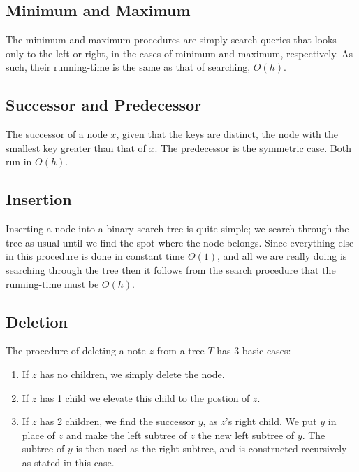 \subsection{Minimum and Maximum}
The minimum and maximum procedures are simply search queries that looks only
to the left or right, in the cases of minimum and maximum, respectively. As
such, their running-time is the same as that of searching, $O(h)$.

\subsection{Successor and Predecessor}
The successor of a node $x$, given that the keys are distinct, the node with
the smallest key greater than that of $x$. The predecessor is the symmetric
case. Both run in $O(h)$.

\subsection{Insertion}
Inserting a node into a binary search tree is quite simple; we search through
the tree as usual until we find the spot where the node belongs. Since
everything else in this procedure is done in constant time $\Theta(1)$, and
all we are really doing is searching through the tree then it follows from the
search procedure that the running-time must be $O(h)$.

\newpage
\subsection{Deletion}
The procedure of deleting a note $z$ from a tree $T$ has 3 basic cases:

\begin{enumerate}
\item{If $z$ has no children, we simply delete the node.}
\item{If $z$ has 1 child we elevate this child to the postion of $z$.}
\item{If $z$ has 2 children, we find the successor $y$, as $z$'s right child.
We put $y$ in place of $z$ and make the left subtree of $z$ the new left
subtree of $y$. The subtree of $y$ is then used as the right subtree, and is
constructed recursively as stated in this case.}
\end{enumerate}

